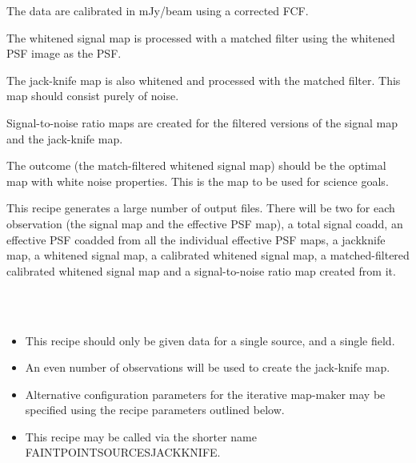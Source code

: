\documentclass[twoside,11pt]{article}
\renewcommand{\_}{\texttt{\symbol{95}}}
\newcommand{\sstnotes}[1]{\item[Notes:] \mbox{} \\[1.3ex] #1}
\newcommand{\sstitemlist}[1]{
  \mbox{} \\
  \vspace{-3.5ex}
  \begin{itemize}
     #1
  \end{itemize}
}
\newcommand{\sstitem}{\item}
\newcommand{\sstnotes}[1]{\item[Notes:] #1 }
\newcommand{\sstitemlist}[1]{
      \begin{itemize}
         #1
      \end{itemize}
      \\
   }
\newcommand{\sstitem}{\item}
\begin{document}
{{{         \sstitem
         The data are calibrated in mJy/beam using a corrected FCF.

         \sstitem
         The whitened signal map is processed with a matched filter
         using the whitened PSF image as the PSF.

         \sstitem
         The jack-knife map is also whitened and processed with the
         matched filter. This map should consist purely of noise.

         \sstitem
         Signal-to-noise ratio maps are created for the filtered
         versions of the signal map and the jack-knife map.

      }
      The outcome (the match-filtered whitened signal map) should be the
      optimal map with white noise properties. This is the map to be
      used for science goals.

      This recipe generates a large number of output files. There will
      be two for each observation (the signal map and the effective PSF
      map), a total signal coadd, an effective PSF coadded from all the
      individual effective PSF maps, a jackknife map, a whitened signal
      map, a calibrated whitened signal map, a matched-filtered
      calibrated whitened signal map and a signal-to-noise ratio map
      created from it.
   }
   \sstnotes{
      \sstitemlist{

         \sstitem
         This recipe should only be given data for a single source, and
         a single field.

         \sstitem
         An even number of observations will be used to create the
         jack-knife map.

         \sstitem
         Alternative configuration parameters for the iterative
         map-maker may be specified using the recipe parameters outlined
         below.

         \sstitem
         This recipe may be called via the shorter name
         FAINT\_POINT\_SOURCES\_JACKKNIFE.

}}}
\end{document}
